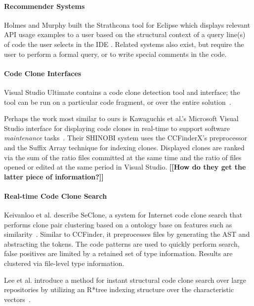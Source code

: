 \documentclass[preprint,10pt]{sigplanconf}
\newcommand{\todo}[1]{{\bfseries [[#1]]}}
\begin{document}
\paragraph{Recommender Systems}

Holmes and Murphy built the Strathcona tool for Eclipse which displays
relevant API usage examples to a user based on the structural context
of a query line(s) of code the user selects in the IDE
\cite{Holmes2005}. Related systems also exist, but require the user to
perform a formal query, or to write special comments in the code.

\paragraph{Code Clone Interfaces}

Visual Studio Ultimate contains a code clone detection tool and
interface; the tool can be run on a particular code fragment, or over
the entire solution~\cite{VSClones}. 

Perhaps the work most similar to ours is Kawaguchis et al.'s 
Microsoft Visual Studio interface for
displaying code clones in real-time to support software
\emph{maintenance} tasks~\cite{Kawaguchi2009,Yamashina2008}. Their
SHINOBI system uses the CCFinderX's preprocessor and the Suffix Array
technique for indexing clones. Displayed clones are ranked via the sum
of the ratio files committed at the same time and the ratio of files
opened or edited at the same period in Visual Studio. \todo{How do
  they get the latter piece of information?}

\paragraph{Real-time Code Clone Search}

Keivanloo et al. describe SeClone, a system for Internet code clone
search that performs clone pair clustering based on a ontology base on
features such as similarity~\cite{Keivanloo2011}. Similar to CCFinder,
it preprocesses files by generating the AST and abstracting the
tokens. The code patterns are used to quickly perform search, false
positives are limited by a retained set of type information. Results
are clustered via file-level type information.

Lee et al. introduce a method for instant structural code clone search
over large repositories by utilizing an R*tree indexing structure over
the characteristic vectors~\cite{Lee2010}.
\end{document}
